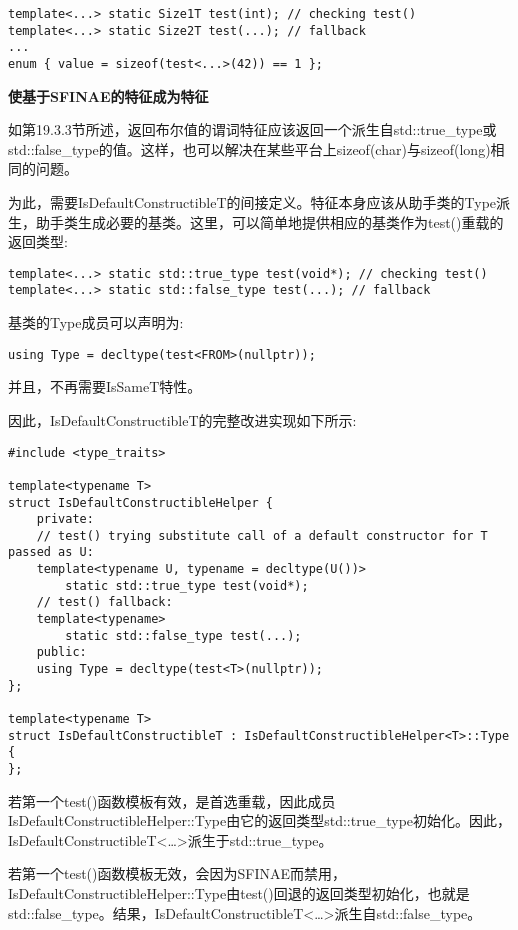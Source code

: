 \begin{lstlisting}[style=styleCXX]
template<...> static Size1T test(int); // checking test()
template<...> static Size2T test(...); // fallback
...
enum { value = sizeof(test<...>(42)) == 1 };
\end{lstlisting}

\noindent
\textbf{使基于SFINAE的特征成为特征}

如第19.3.3节所述，返回布尔值的谓词特征应该返回一个派生自std::true\_type或std::false\_type的值。这样，也可以解决在某些平台上sizeof(char)与sizeof(long)相同的问题。

为此，需要IsDefaultConstructibleT的间接定义。特征本身应该从助手类的Type派生，助手类生成必要的基类。这里，可以简单地提供相应的基类作为test()重载的返回类型:

\begin{lstlisting}[style=styleCXX]
template<...> static std::true_type test(void*); // checking test()
template<...> static std::false_type test(...); // fallback
\end{lstlisting}

基类的Type成员可以声明为:

\begin{lstlisting}[style=styleCXX]
using Type = decltype(test<FROM>(nullptr));
\end{lstlisting}

并且，不再需要IsSameT特性。

因此，IsDefaultConstructibleT的完整改进实现如下所示:

\begin{lstlisting}[style=styleCXX]
#include <type_traits>

template<typename T>
struct IsDefaultConstructibleHelper {
	private:
	// test() trying substitute call of a default constructor for T passed as U:
	template<typename U, typename = decltype(U())>
		static std::true_type test(void*);
	// test() fallback:
	template<typename>
		static std::false_type test(...);
	public:
	using Type = decltype(test<T>(nullptr));
};

template<typename T>
struct IsDefaultConstructibleT : IsDefaultConstructibleHelper<T>::Type {
};
\end{lstlisting}

若第一个test()函数模板有效，是首选重载，因此成员IsDefaultConstructibleHelper::Type由它的返回类型std::true\_type初始化。因此，IsDefaultConstructibleT<…>派生于std::true\_type。

若第一个test()函数模板无效，会因为SFINAE而禁用，IsDefaultConstructibleHelper::Type由test()回退的返回类型初始化，也就是std::false\_type。结果，IsDefaultConstructibleT<…>派生自std::false\_type。

